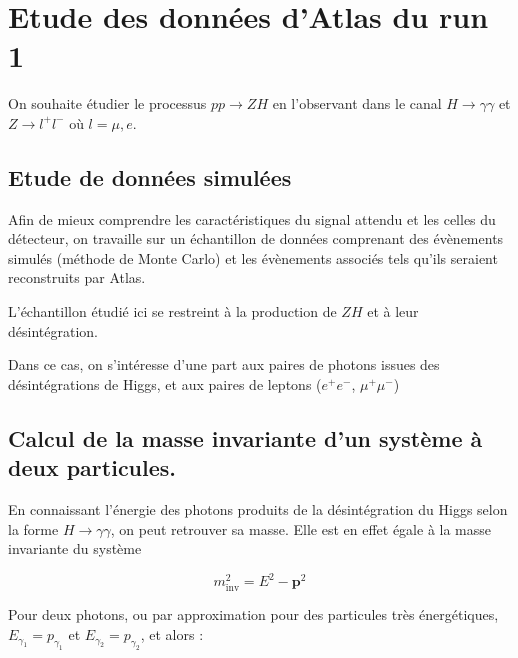 \documentclass[11pt]{article} %
\begin{document}

\section{Etude des données d'Atlas du run 1}

On souhaite étudier le processus $pp\to ZH$ en l'observant dans le canal $H\to\gamma\gamma$ et $Z\to l^+l^-$ où $l=\mu,e$.

\subsection{Etude de données simulées}

Afin de mieux comprendre les caractéristiques du signal attendu et les celles du détecteur, on travaille sur un échantillon de données comprenant des évènements simulés (méthode de Monte Carlo) et les évènements associés tels qu'ils seraient reconstruits par Atlas.

L'échantillon étudié ici se restreint à la production de $ZH$ et à leur désintégration.

Dans ce cas, on s'intéresse d'une part aux paires de photons issues des désintégrations de Higgs, et aux paires de leptons ($e^+e^-$, $\mu^+\mu^-$)

\subsection{Calcul de la masse invariante d'un système à deux particules.}

En connaissant l'énergie des photons produits de la désintégration du Higgs selon la forme $H\to \gamma \gamma$, on peut retrouver sa masse. Elle est en effet égale à la masse invariante du système 

\begin{equation}
m_{\textrm{inv}}^2 = E^2 - \textbf{p}^2
\end{equation}

Pour deux photons,  ou par approximation pour des particules très énergétiques, $E_{\gamma_1} = p_{\gamma_1}$ et $E_{\gamma_2} = p_{\gamma_2}$, et alors :
\end{document}
